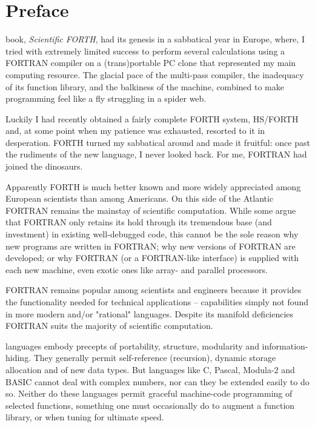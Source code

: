 
\chapter{Preface}
 book, \textit{Scientific FORTH}, had its genesis in a sabbatical year in Europe, where, I tried with extremely limited success to perform several calculations using a FORTRAN compiler on a (trans)portable PC clone that represented my main computing resource. The glacial pace of the multi-pass compiler, the inadequacy of its function library, and the balkiness of the machine, combined to make programming feel like a fly struggling in a spider web.

Luckily I had recently obtained a fairly complete FORTH system, HS/FORTH  and, at some point when my patience was exhausted, resorted to it in desperation. FORTH turned my sabbatical around and made it fruitful: once past the rudiments of the new language, I never looked back. For me, FORTRAN had joined the dinosaurs.

Apparently FORTH is much better known and more widely appreciated among European scientists than among Americans. On this side of the Atlantic FORTRAN remains the mainstay of scientific computation. While some argue that FORTRAN only retains its hold through its tremendous base (and investment) in existing well-debugged code, this cannot be the sole reason why new programs are written in FORTRAN; why new versions of FORTRAN are developed; or why FORTRAN (or a FORTRAN-like interface) is supplied with each new machine, even exotic ones like array- and parallel processors.

FORTRAN remains popular among scientists and engineers because it provides the functionality needed for technical applications -- capabilities simply not found in more modern and/or "rational" languages. Despite its manifold deficiencies FORTRAN suits the majority of scientific computation.

 languages embody precepts of portability, structure, modularity and information-hiding. They generally permit self-reference (recursion), dynamic storage allocation and of new data types. But languages like C, Pascal, Modula-2 and BASIC cannot deal with complex numbers, nor can they be extended easily to do so. Neither do these languages permit graceful machine-code programming of selected functions, something one must occasionally do to augment a function library, or when tuning for ultimate speed.
 

